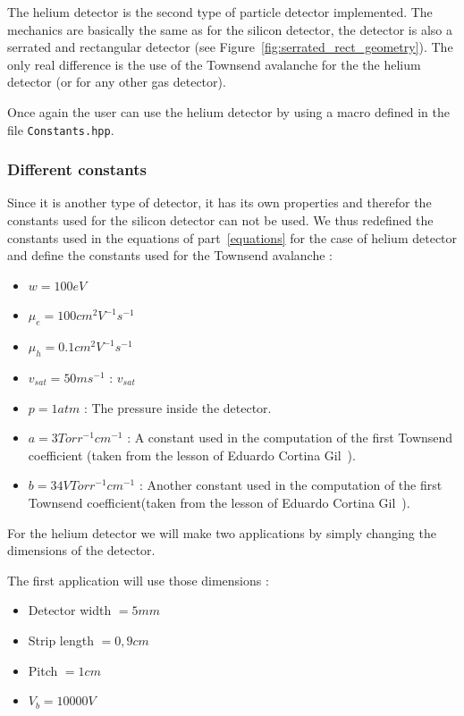 \documentclass[11pt]{article}
\begin{document}
		The helium detector is the second type of particle detector implemented. The mechanics are basically
		the same as for the silicon detector, the detector is also a serrated and rectangular detector
		(see Figure~\ref{fig:serrated_rect_geometry}). The only real difference is the use of the Townsend
		avalanche for the the helium detector (or for any other gas detector).

		Once again the user can use the helium detector by using a macro defined in the file
		\texttt{Constants.hpp}.

		\subsubsection*{Different constants}

			Since it is another type of detector, it has its own properties and therefor the constants
			used for the silicon detector can not be used. We thus redefined the constants used in the
			equations of part~\ref{equations} for the case of helium detector and define the constants
			used for the Townsend avalanche :

			\begin{itemize}

				\item $w = 100 eV$
				\item $\mu_e = 100 cm^2V^{-1}s^{-1}$
				\item $\mu_h = 0.1 cm^2V^{-1}s^{-1}$
				\item $v_{sat} = 50 ms^{-1}$ : $v_{sat}$
				\item $p = 1 atm$ : The pressure inside the detector.
				\item $a = 3 Torr^{-1}cm^{-1}$ : A constant used in the computation of the first
					Townsend coefficient (taken from the lesson of Eduardo Cortina Gil~\cite{lphy2236}).
				\item $b = 34 VTorr^{-1}cm^{-1}$ : Another constant used in the computation of the 
					first Townsend coefficient(taken from the lesson of Eduardo Cortina Gil~\cite{lphy2236}).

			\end{itemize}

			For the helium detector we will make two applications by simply changing the dimensions of
			the detector.

			The first application will use those dimensions :
			\begin{itemize}

				\item Detector width $= 5 mm$
				\item Strip length $= 0,9 cm$
				\item Pitch $= 1 cm$
				\item $V_b = 10000 V$

			\end{itemize}
\end{document}

